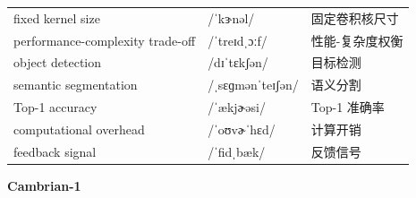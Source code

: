 \documentclass[UTF8,12pt,a4paper]{ctexart}
\providecommand{\zh}[1]{#1}
\begin{document}
\begin{tabular*}{\textwidth}{@{\extracolsep{\fill}}lll@{}}
fixed kernel size & {\ipafont /ˈkɝnəl/} & \zh{固定卷积核尺寸} \\
performance-complexity trade-off & {\ipafont /ˈtreɪdˌɔːf/} & \zh{性能-复杂度权衡} \\
object detection & {\ipafont /dɪˈtɛkʃən/} & \zh{目标检测} \\
semantic segmentation & {\ipafont /ˌsɛɡmənˈteɪʃən/} & \zh{语义分割} \\
Top-1 accuracy & {\ipafont /ˈækjɚəsi/} & \zh{Top-1 准确率} \\
computational overhead & {\ipafont /ˈoʊvɚˈhɛd/} & \zh{计算开销} \\
feedback signal & {\ipafont /ˈfidˌbæk/} & \zh{反馈信号} \\
\bottomrule
\end{tabular*}

\newpage

\begin{center}
    {\Large\bfseries Cambrian-1}
\end{center}
\end{document}
